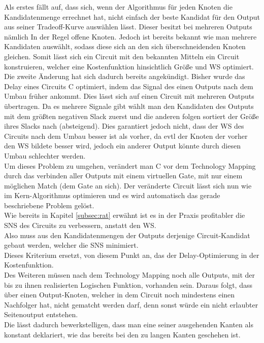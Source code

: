 \documentclass[11pt, a4paper, german]{article}
\newcommand{\TM}{Technology Mapping }
\begin{document}
Als erstes fällt auf, dass sich, wenn der Algorithmus für jeden Knoten die Kandidatenmenge errechnet hat, nicht einfach der beste Kandidat für den Output aus seiner Tradeoff-Kurve auswählen lässt. Dieser besitzt bei mehreren Outputs nämlich In der Regel offene Knoten. 
Jedoch ist bereits bekannt wie man mehrere Kandidaten auswählt, sodass diese sich an den sich überschneidenden Knoten gleichen. Somit lässt sich ein Circuit mit den bekannten Mitteln ein Circuit konstruieren, welcher eine Kostenfunktion hinsichtlich Größe und WS optimiert. \\

Die zweite Änderung hat sich dadurch bereits angekündigt. Bisher wurde das Delay eines Circuits C optimiert, indem das Signal des einen Outputs nach dem Umbau früher ankommt. Dies lässt sich auf einen Circuit mit mehreren Outputs übertragen. Da es mehrere Signale gibt wählt man den Kandidaten des Outputs mit dem größten negativen Slack zuerst und die anderen folgen sortiert der Größe ihres Slacks nach (absteigend). Dies garantiert jedoch nicht, dass der WS des Circuits nach dem Umbau besser ist als vorher, da evtl der Knoten der vorher den WS bildete besser wird, jedoch ein anderer Output könnte durch diesen Umbau schlechter werden. \\
Um dieses Problem zu umgehen, verändert man C vor dem \TM durch das verbinden aller Outputs mit einem virtuellen Gate, mit nur einem möglichen Match (dem Gate an sich). Der veränderte Circuit lässt sich nun wie im Kern-Algorithmus optimieren und es wird automatisch das gerade beschriebene Problem gelöst.\\ 
Wie bereits in Kapitel \ref{subsec:rat}  erwähnt ist es in der Praxis profitabler die SNS des Circuits zu verbessern, anstatt den WS.\\
Also muss aus den Kandidatenmengen der Outputs derjenige Circuit-Kandidat gebaut werden, welcher die SNS minimiert.\\
 Dieses Kriterium ersetzt, von diesem Punkt an,  das der Delay-Optimierung in der Kostenfunktion.\\
 
 Des Weiteren müssen nach dem \TM noch alle Outputs, mit der bis zu ihnen realisierten Logischen Funktion, vorhanden sein. Daraus folgt, dass über einen Output-Knoten, welcher in dem Circuit noch mindestens einen Nachfolger hat, nicht gematcht werden darf, denn sonst würde ein nicht erlaubter Seitenoutput entstehen.\\
 Die lässt dadurch bewerkstelligen, dass man eine seiner ausgehenden Kanten als konstant deklariert, wie das bereits bei den zu langen Kanten geschehen ist. 
\end{document}
